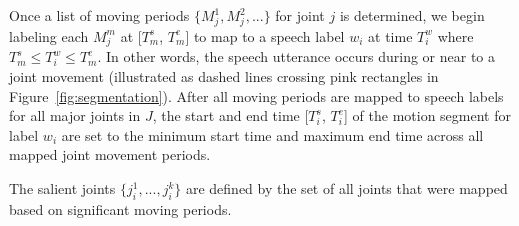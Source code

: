 Once a list of moving periods $\{M_j^1, M_j^2, ...\}$ for joint $j$ is determined, we begin labeling each $M_j^m$ at [$T_{m}^s$, $T_{m}^e$] to map to a speech label $w_i$ at time $T_i^w$ where $T_m^s \leq T_i^w \leq T_m^e$. In other words, the speech utterance occurs during or near to a joint movement (illustrated as dashed lines crossing pink rectangles in Figure~\ref{fig:segmentation}).
%
%
%
%
%
%
After all moving periods are mapped to speech labels for all major joints in $J$, the start and end time [$T_i^s$, $T_i^e$] of the motion segment for label $w_i$ are set to the minimum start time and maximum end time across all mapped joint movement periods.

The salient joints $\{j_i^1, ..., j_i^k\}$ are defined by the set of all joints that were mapped based on significant moving periods.

